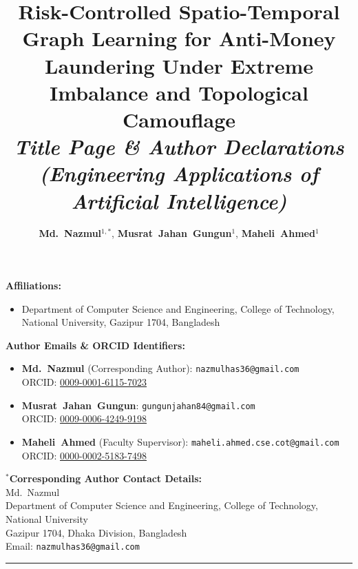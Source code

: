 \documentclass[a4paper,11pt]{article}
\title{\textbf{Risk-Controlled Spatio-Temporal Graph Learning for Anti-Money Laundering Under Extreme Imbalance and Topological Camouflage}\\[0.8ex]
\large\textit{Title Page \& Author Declarations (Engineering Applications of Artificial Intelligence)}}
\author{
    \textbf{Md.~Nazmul}$^{1,*}$, 
    \textbf{Musrat~Jahan~Gungun}$^{1}$, 
    \textbf{Maheli~Ahmed}$^{1}$
}
\date{}
\begin{document}
\maketitle
\thispagestyle{empty}

\vspace{-2.0ex}
\noindent\textbf{Affiliations:}
\begin{itemize}[leftmargin=*,itemsep=1pt]
    \item[$^{1}$] Department of Computer Science and Engineering, College of Technology,\\ National University, Gazipur 1704, Bangladesh
\end{itemize}

\vspace{1.0ex}
\noindent\textbf{Author Emails \& ORCID Identifiers:}
\begin{itemize}[leftmargin=*,itemsep=1pt]
    \item \textbf{Md.~Nazmul} (Corresponding Author): \texttt{nazmulhas36@gmail.com} \\
    ORCID: \href{https://orcid.org/0009-0001-6115-7023}{0009-0001-6115-7023}
    \item \textbf{Musrat~Jahan~Gungun}: \texttt{gungunjahan84@gmail.com} \\
    ORCID: \href{https://orcid.org/0009-0006-4249-9198}{0009-0006-4249-9198}
    \item \textbf{Maheli~Ahmed} (Faculty Supervisor): \texttt{maheli.ahmed.cse.cot@gmail.com} \\
    ORCID: \href{https://orcid.org/0000-0002-5183-7498}{0000-0002-5183-7498}
\end{itemize}

\vspace{1.0ex}
\noindent$^{*}$\textbf{Corresponding Author Contact Details:} \\
Md.~Nazmul \\
Department of Computer Science and Engineering, College of Technology, National University \\
Gazipur 1704, Dhaka Division, Bangladesh \\
Email: \texttt{nazmulhas36@gmail.com}

\vspace{2.0ex}
\hrule
\vspace{2.0ex}
\end{document}
